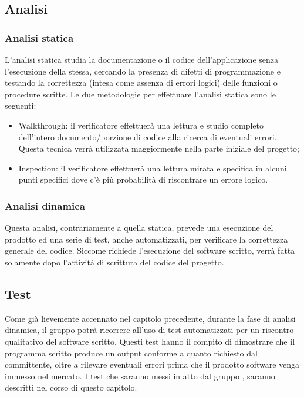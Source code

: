 \subsection{Analisi}
\subsubsection{Analisi statica}
L’analisi statica studia la documentazione o il codice dell’applicazione senza l’esecuzione della stessa, cercando la presenza di difetti di programmazione e testando la correttezza (intesa come assenza di errori logici) delle funzioni o procedure scritte.
Le due metodologie per effettuare l’analisi statica sono le seguenti:
\begin{itemize}
	\item Walkthrough: il verificatore effettuerà una lettura e studio completo dell’intero documento/porzione di codice alla ricerca di eventuali errori. Questa tecnica verrà utilizzata maggiormente nella parte iniziale del progetto;
	\item Inspection: il verificatore effettuerà una lettura mirata e specifica in alcuni punti specifici dove c’è più probabilità di riscontrare un errore logico.
\end{itemize}

\subsubsection{Analisi dinamica}
Questa analisi, contrariamente a quella statica, prevede una esecuzione del prodotto ed una serie di test, anche automatizzati, per verificare la correttezza generale del codice. Siccome richiede l’esecuzione del software scritto, verrà fatta solamente dopo l’attività di scrittura del codice del progetto.

\subsection{Test}
Come già lievemente accennato nel capitolo precedente, durante la fase di analisi dinamica, il gruppo {\Gruppo} potrà ricorrere all’uso di test automatizzati per un riscontro qualitativo del software scritto. Questi test hanno il compito di dimostrare che il programma scritto produce un output conforme a quanto richiesto dal committente, oltre a rilevare eventuali errori prima che il prodotto software venga immesso nel mercato. I test che saranno messi in atto dal gruppo {\Gruppo}, saranno descritti nel corso di questo capitolo.

